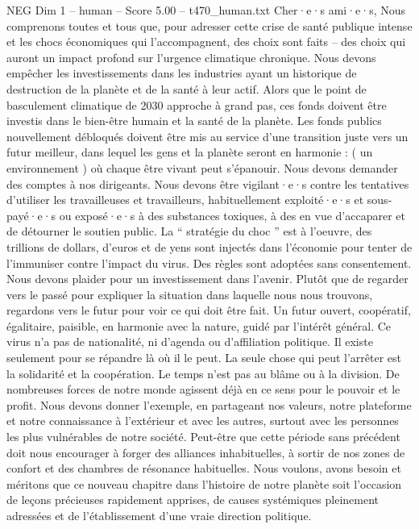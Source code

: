 \begin{textsample}{NEG Dim 1 – human – Score 5.00 – t470\_human.txt}  \label{ex:f1_neg_050}
Cher·e·s ami·e·s, Nous comprenons toutes et tous que, pour adresser cette crise de santé publique intense et les chocs économiques qui l’accompagnent, des choix sont faits – des choix qui auront un impact profond sur l’urgence climatique chronique.
Nous devons empêcher les investissements dans les industries ayant un historique de destruction de la planète et de la santé à leur actif.
Alors que le point de basculement climatique de 2030 approche à grand pas, ces fonds doivent être investis dans le bien-être humain et la santé de la planète.
Les fonds publics nouvellement débloqués doivent être mis au service d’une transition juste vers un futur meilleur, dans lequel les gens et la planète seront en harmonie : ( un environnement ) où chaque être vivant peut s’épanouir.
Nous devons demander des comptes à nos dirigeants.
Nous devons être vigilant·e·s contre les tentatives d’utiliser les travailleuses et travailleurs, habituellement exploité·e·s et sous-payé·e·s ou exposé·e·s à des substances toxiques, à des en vue d’accaparer et de détourner le soutien public.
La “ stratégie du choc ” est à l’oeuvre, des trillions de dollars, d’euros et de yens sont injectés dans l’économie pour tenter de l’immuniser contre l’impact du virus.
Des règles sont adoptées sans consentement.
Nous devons plaider pour un investissement dans l’avenir.
Plutôt que de regarder vers le passé pour expliquer la situation dans laquelle nous nous trouvons, regardons vers le futur pour voir ce qui doit être fait.
Un futur ouvert, coopératif, égalitaire, paisible, en harmonie avec la nature, guidé par l’intérêt général.
Ce virus n’a pas de nationalité, ni d’agenda ou d’affiliation politique.
Il existe seulement pour se répandre là où il le peut.
La seule chose qui peut l’arrêter est la solidarité et la coopération.
Le temps n’est pas au blâme ou à la division.
De nombreuses forces de notre monde agissent déjà en ce sens pour le pouvoir et le profit.
Nous devons donner l’exemple, en partageant nos valeurs, notre plateforme et notre connaissance à l’extérieur et avec les autres, surtout avec les personnes les plus vulnérables de notre société.
Peut-être que cette période sans précédent doit nous encourager à forger des alliances inhabituelles, à sortir de nos zones de confort et des chambres de résonance habituelles.
Nous voulons, avons besoin et méritons que ce nouveau chapitre dans l’histoire de notre planète soit l’occasion de leçons précieuses rapidement apprises, de causes systémiques pleinement adressées et de l’établissement d’une vraie direction politique.

\end{textsample}
